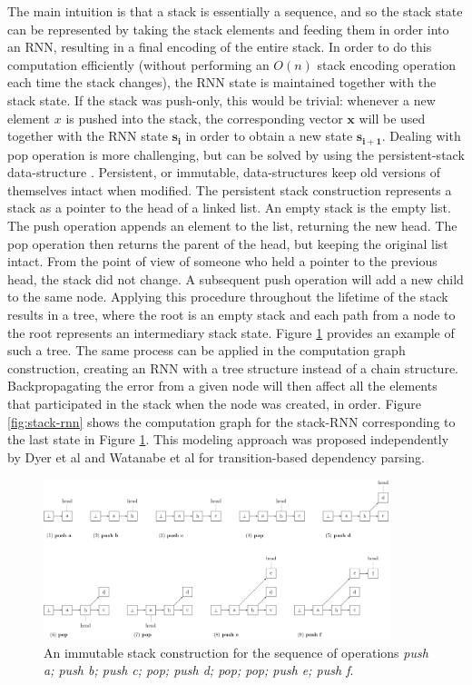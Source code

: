 \documentclass[jair,twoside,11pt,theapa]{article}
\newcommand{\m}[1]{\mathbf{#1}}%
\begin{document}
{The main intuition is that a stack is essentially a sequence, and so the stack
state can be represented by taking the stack elements and feeding them in order
into an RNN, resulting in a final encoding of the entire stack.  In order to do
this computation efficiently (without performing an $O(n)$ stack encoding
operation each time the stack changes), the RNN state is maintained together
with the stack state.  If the stack was push-only, this would be trivial:
whenever a new element $x$ is pushed into the stack, the corresponding vector
$\m{x}$ will be used together with the RNN state $\m{s_i}$ in order to obtain a
new state $\m{s_{i+1}}$.  Dealing with pop operation is more challenging, but
can be solved by using the persistent-stack data-structure
\cite{okasaki1999purely,goldberg2013efficient}.  Persistent, or immutable,
data-structures keep old versions of themselves intact when modified.
The persistent stack construction represents a stack as a pointer
to the head of a linked list.  An empty stack is the empty list.
The push operation appends an element to the list, returning the new head.
The pop operation then returns the parent of the head, but keeping the original
list intact. From the point of view of someone who held a pointer to the
previous head, the stack did not change.  A subsequent push operation will add a
new child to the same node.  Applying this procedure throughout the lifetime of
the stack results in a tree, where the root is an empty stack and each path from
a node to the root represents an intermediary stack state. Figure
\ref{fig:immutable-stack} provides an example of such a tree.
The same process can be applied in the computation graph construction, creating
an RNN with a tree structure instead of a chain structure.  Backpropagating the
error from a given node will then affect all the elements that participated in
the stack when the node was created, in order.  Figure \ref{fig:stack-rnn} shows
the computation graph for the stack-RNN corresponding to the last state in
Figure \ref{fig:immutable-stack}.
This modeling approach was proposed independently by Dyer et al and Watanabe et
al \cite{dyer2015transitionbased,watanabe2015transitionbased} for
transition-based dependency parsing.  

\begin{figure}[ht]
    \begin{center}
    \includegraphics[width=0.9\textwidth]{stack.pdf}
    \end{center}
    \caption{An immutable stack construction for the sequence of operations
    \emph{push a; push b; push c; pop; push d; pop; pop; push e; push f}.}
    \label{fig:immutable-stack}
\end{figure}

}
\end{document}
